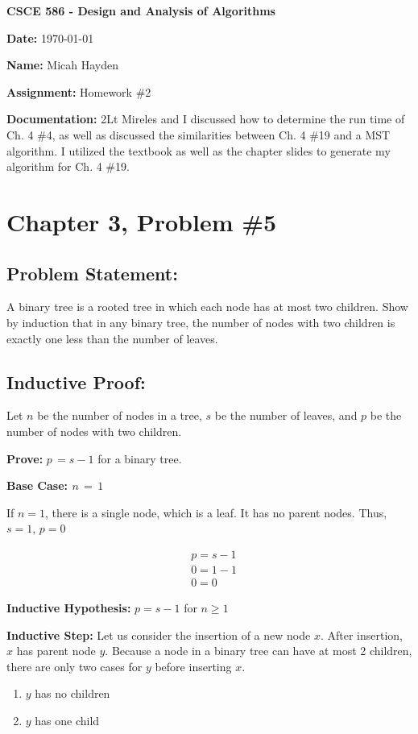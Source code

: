\documentclass{article}
\begin{document}
\noindent \textbf{CSCE 586 - Design and Analysis of Algorithms}

\noindent \textbf{Date:}  \today 

\noindent \textbf{Name:}  Micah Hayden

\noindent \textbf{Assignment:}  Homework \#2

\noindent \textbf{Documentation:} 2Lt Mireles and I discussed how to determine the run time of Ch. 4 \#4, as well as discussed the similarities between Ch. 4 \#19 and a MST algorithm.  I utilized the textbook as well as the chapter slides to generate my algorithm for Ch. 4 \#19.  

\hrulefill

\section*{Chapter 3, Problem \#5}
\subsection*{Problem Statement:}  A binary tree is a rooted tree in which each node has at most two children.  Show by induction that in any binary tree, the number of nodes with two children is exactly one less than the number of leaves.

\subsection*{Inductive Proof:}
Let $n$ be the number of nodes in a tree, $s$ be the number of leaves, and $p$ be the number of nodes with two children.

\noindent \textbf{Prove:} $ p \, = s - 1 $ for a binary tree.

\noindent \textbf{Base Case: $n \, = \, 1$}

If $n = 1$, there is a single node, which is a leaf.  It has no parent nodes.  Thus, $s = 1$, $p = 0$

\begin{align*}
&p = s - 1 \\
&0 = 1 - 1\\
&0 = 0
\end{align*}

\noindent \textbf{Inductive Hypothesis:}
$ p = s - 1 $ for $ n \geq 1 $

\noindent \textbf{Inductive Step:}
Let us consider the insertion of a new node $x$.  After insertion, $x$ has parent node $y$.
Because a node in a binary tree can have at most 2 children, there are only two cases for $y$ before inserting $x$.
\begin{enumerate}
	\item $y$ has no children
	\item $y$ has one child
\end{enumerate}
\end{document}
